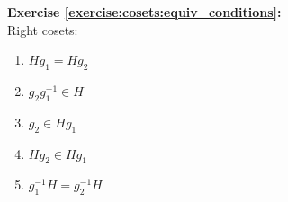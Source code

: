 \noindent\textbf{Exercise \ref{exercise:cosets:equiv_conditions}:} %
\\
Right cosets:
\begin{multicols}{3}
\begin{enumerate}
\item
$Hg_1 = Hg_2$

\item
$g_2 g_1^{-1} \in H$

\item
$g_2 \in Hg_1$

\item
$Hg_2 \in Hg_1$

\item
$g_1^{-1}H = g_2^{-1}H$
\end{enumerate}
\end{multicols}

